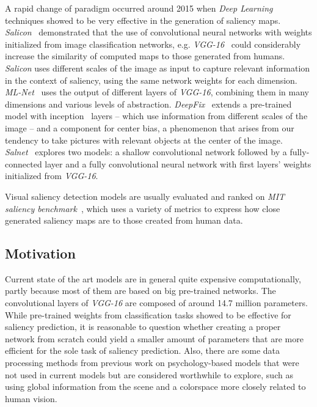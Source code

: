 \documentclass[10pt,twocolumn,letterpaper]{article}
\begin{document}
A rapid change of paradigm occurred around 2015 when \emph{Deep Learning}
techniques showed to be very effective in the generation of saliency
maps.
\emph{Salicon}~\cite{jiang_2015} demonstrated that the use of
convolutional neural networks with weights initialized from
image classification networks, e.g. \emph{VGG-16}~\cite{zisserman_2014}
could considerably increase the similarity of computed maps to those
generated from humans.
\emph{Salicon} uses different scales of the image as input to capture relevant
information in the context of saliency, using the same network weights
for each dimension.
\emph{ML-Net}~\cite{cornia_2016} uses the output of different layers
of \emph{VGG-16}, combining them in many dimensions and various levels of
abstraction.
\emph{DeepFix}~\cite{kruthiventi_2015} extends a pre-trained model with
inception~\cite{szegedy_2014} layers -- which use information from different
scales of the image -- and a component for center bias, a
phenomenon that arises from our tendency to take pictures with relevant
objects at the center of the image.
\emph{Salnet}~\cite{pan_2016} explores two models: a shallow convolutional
network followed by a fully-connected layer and a fully convolutional
neural network with first layers' weights initialized from \emph{VGG-16}.

Visual saliency detection models are usually evaluated and ranked on
\emph{MIT saliency benchmark}~\cite{mit_sal_bm}, which uses a variety of
metrics to express how close generated saliency maps are to those created
from human data.

\subsection{Motivation}
Current state of the art models are in general quite expensive computationally,
partly because most of them are based on big pre-trained networks.
The convolutional layers of \emph{VGG-16} are composed of around 14.7
million parameters.
While pre-trained weights from classification tasks showed to be effective
for saliency prediction, it is reasonable to question whether
creating a proper network from scratch could yield a smaller amount of
parameters that are more efficient for the sole task of saliency prediction.
Also, there are some data processing methods from previous work on
psychology-based models that were not used in current models but
are considered worthwhile to explore,
such as using global information from the scene and a colorspace more
closely related to human vision.
\end{document}
